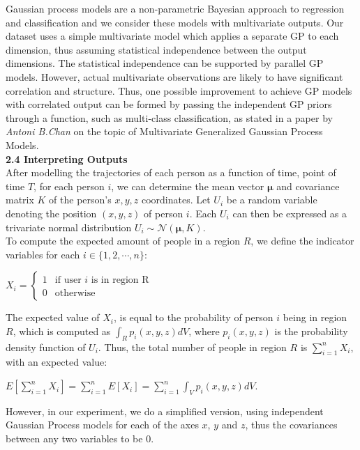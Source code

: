 \documentclass[letterpaper]{article}
\begin{document}
Gaussian process models are a non-parametric Bayesian approach to regression and classification and we consider these models with multivariate outputs. Our dataset uses a simple multivariate model which applies a separate GP to each dimension, thus assuming statistical independence between the output dimensions. The statistical independence can be supported by parallel GP models. However, actual multivariate observations are likely to have significant correlation and structure. Thus, one possible improvement to achieve GP models with correlated output can be formed by passing the independent GP priors through a function, such as multi-class classification, as stated in a paper by {\it Antoni B.Chan} on the topic of Multivariate Generalized Gaussian Process Models. \\


{\bf2.4  Interpreting Outputs} \\

After modelling the trajectories of each person as a function of time, point of time $T$, for each person $i$, we can determine the mean vector $\boldsymbol{\mu}$ and covariance matrix $K$ of the person's $x,y,z$ coordinates. Let $U_i$ be a random variable denoting the position $(x,y,z)$ of person $i$. Each $U_i$ can then be expressed as a trivariate normal distribution $U_i \sim \mathcal{N}(\boldsymbol{\mu},K)$.\\

To compute the expected amount of people in a region $R$, we define the indicator variables for each $i \in \{1,2,\cdots,n\}$:
\begin{center}
$X_i =
\begin{cases}
    1 &\text{if user }i\text{ is in region R}\\
    0 &\text{otherwise}
\end{cases}$
\end{center}
The expected value of $X_i$, is equal to the probability of person $i$ being in region $R$, which is computed as $\int_R p_i(x,y,z)dV$, where $p_i(x,y,z)$ is the probability density function of $U_i$. Thus, the total number of people in region $R$ is $\sum_{i=1}^n X_i$, with an expected value:
\begin{center}
$\displaystyle E[\sum_{i=1}^n X_i] = \sum_{i=1}^n E[X_i] = \sum_{i=1}^n \int_V p_i(x,y,z)dV$.
\end{center}

However, in our experiment, we do a simplified version, using independent Gaussian Process models for each of the axes $x$, $y$ and $z$, thus the covariances between any two variables to be $0$. \\
\end{document}
